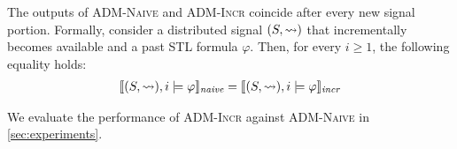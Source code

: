 \begin{theorem} \label{cl:algoOnline}
	The outputs of \textsc{ADM-Naive} and \textsc{ADM-Incr} coincide after every new signal portion.
	Formally, consider a distributed signal $(S,{\rightsquigarrow})$ that incrementally becomes available and a past STL formula $\varphi$.
	Then, for every $i \geq 1$, the following equality holds:
	\begin{align*}
		\llbracket (S, {\rightsquigarrow}), i \models \varphi \rrbracket_{\textit{naive}} = \llbracket (S, {\rightsquigarrow}), i \models \varphi \rrbracket_{\textit{incr}}
	\end{align*}
\end{theorem}

We evaluate the performance of \textsc{ADM-Incr} against \textsc{ADM-Naive} in \cref{sec:experiments}.
\egroup





